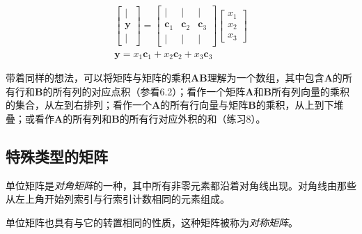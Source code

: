 \[
  \begin{array}{c}
    {\left[\begin{array}{c}
                 \mid       \\
                 \mathbf{y} \\
                 \mid
               \end{array}\right]=\left[\begin{array}{ccc}
                                          \mid           & \mid           & \mid           \\
                                          \mathbf{c}_{1} & \mathbf{c}_{2} & \mathbf{c}_{3} \\
                                          \mid           & \mid           & \mid
                                        \end{array}\right]\left[\begin{array}{l}
                                                                  x_{1} \\
                                                                  x_{2} \\
                                                                  x_{3}
                                                                \end{array}\right]} \\
    \mathbf{y}=x_{1} \mathbf{c}_{1}+x_{2} \mathbf{c}_{2}+x_{3} \mathbf{c}_{3}
  \end{array}
\]

带着同样的想法，可以将矩阵与矩阵的乘积$\mathbf{AB}$理解为一个数组，其中包含$\mathbf{A}$的所有行和$\mathbf{B}$的所有列的对应点积（参看6.2）；看作一个矩阵$\mathbf{A}$和$\mathbf{B}$所有列向量的乘积的集合，从左到右排列；看作一个$\mathbf{A}$的所有行向量与矩阵$\mathbf{B}$的乘积，从上到下堆叠；或看作$\mathbf{A}$的所有列和$\mathbf{B}$的所有行对应外积的和（练习8）。

\subsection{特殊类型的矩阵}

单位矩阵是\textit{对角矩阵}的一种，其中所有非零元素都沿着对角线出现。对角线由那些从左上角开始列索引与行索引计数相同的元素组成。

单位矩阵也具有与它的转置相同的性质，这种矩阵被称为\textit{对称矩阵}。


